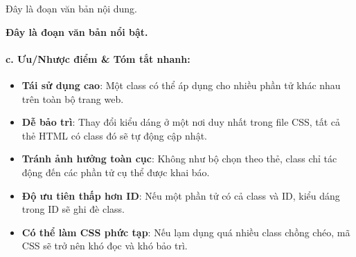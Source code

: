 \documentclass[11pt,oneside]{book}
\begin{document}
\begin{browserWindow}
\sffamily\small
{} \par\vspace{4pt}
\flushleft
\textcolor{darkText}{Đây là đoạn văn bản nội dung.} \par\vspace{2pt}
\colorbox{yellow!80}{\textcolor{darkText}{\textbf{Đây là đoạn văn bản nổi bật.}}} \par\vspace{4pt}
\end{browserWindow}

\paragraph{c. Ưu/Nhược điểm \& Tóm tắt nhanh:}

\begin{tipBox}
\begin{itemize}[leftmargin=1.5em, itemsep=2pt, parsep=0pt]
    \item \textbf{Tái sử dụng cao}: Một class có thể áp dụng cho nhiều phần tử khác nhau trên toàn bộ trang web.
    \item \textbf{Dễ bảo trì}: Thay đổi kiểu dáng ở một nơi duy nhất trong file CSS, tất cả thẻ HTML có class đó sẽ tự động cập nhật.
    \item \textbf{Tránh ảnh hưởng toàn cục}: Không như bộ chọn theo thẻ, class chỉ tác động đến các phần tử cụ thể được khai báo.
\end{itemize}
\end{tipBox}

\begin{warnBox}
\begin{itemize}[leftmargin=1.5em, itemsep=2pt, parsep=0pt]
    \item \textbf{Độ ưu tiên thấp hơn ID}: Nếu một phần tử có cả class và ID, kiểu dáng trong ID sẽ ghi đè class.
    \item \textbf{Có thể làm CSS phức tạp}: Nếu lạm dụng quá nhiều class chồng chéo, mã CSS sẽ trở nên khó đọc và khó bảo trì.
\end{itemize}
\end{warnBox}
\end{document}
